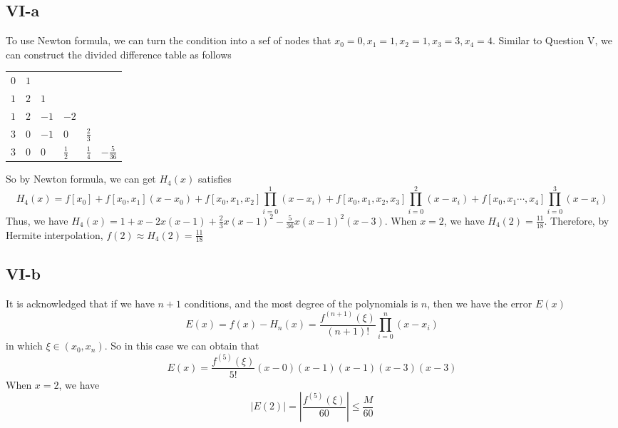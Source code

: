 \documentclass[a4paper]{article}
\begin{document}
\subsection*{VI-a}
To use Newton formula, we can turn the condition into a sef of nodes that $x_0=0,x_1=1,x_2=1,x_3=3,x_4=4$.
Similar to Question V, we can construct the divided difference table as follows
\begin{table}[H]
\centering
  \begin{tabular}{l|lllll}
  $0$ & $1$ &      &               &               &                 \\
  $1$ & $2$ & $1$  &               &               &                 \\
  $1$ & $2$ & $-1$ & $-2$          &               &                 \\
  $3$ & $0$ & $-1$ & $0$           & $\frac{2}{3}$ &                 \\
  $3$ & $0$ & $0$  & $\frac{1}{2}$ & $\frac{1}{4}$ & $-\frac{5}{36}$
  \end{tabular}
\end{table}
\noindent So by Newton formula, we can get $H_4(x)$ satisfies
\begin{equation}
  H_4(x)=f[x_0]+f[x_0,x_1](x-x_0)+f[x_0,x_1,x_2]\prod_{i=0}^{1}(x-x_i)+f[x_0,x_1,x_2,x_3]\prod_{i=0}^{2}(x-x_i)+f[x_0,x_1\cdots,x_4]\prod_{i=0}^{3}(x-x_i)
\end{equation}
Thus, we have $H_4(x)=1+x-2x(x-1)+\frac{2}{3}x(x-1)^2-\frac{5}{36}x(x-1)^2(x-3)$. When $x=2$, we have $H_4(2)=\frac{11}{18}$. Therefore,
by Hermite interpolation, $f(2)\approx H_4(2)=\frac{11}{18}$
\subsection*{VI-b}
It is acknowledged that if we have $n+1$ conditions, and the most degree of the polynomials is $n$, then we have the error $E(x)$
\begin{equation}
  E(x)=f(x)-H_n(x)=\frac{f^{(n+1)}(\xi)}{(n+1)!}\prod_{i=0}^n(x-x_i)
\end{equation}
in which $\xi \in (x_0,x_n)$.
So in this case we can obtain that
\begin{equation}
  E(x)=\frac{f^{(5)}(\xi)}{5!}(x-0)(x-1)(x-1)(x-3)(x-3)
\end{equation}
When $x=2$, we have 
\begin{equation}
  |E(2)|=|\frac{f^{(5)}(\xi)}{60}|\leq \frac{M}{60}
\end{equation}
\end{document}
